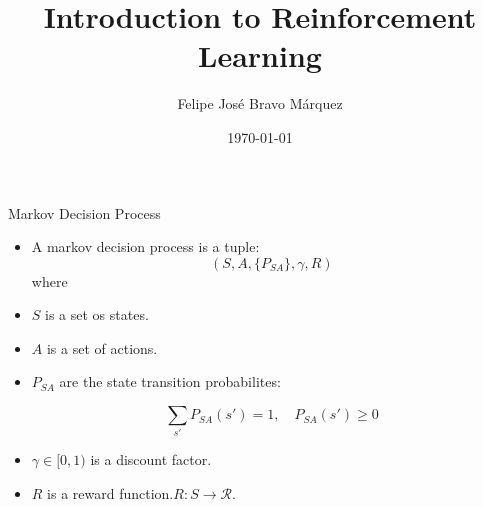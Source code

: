 \documentclass[handout]{beamer}
\title{Introduction to Reinforcement Learning}
\author[Felipe Bravo Márquez]{\footnotesize
 \textcolor[rgb]{0.00,0.00,1.00}{Felipe José Bravo Márquez}}
\date{ \today }
\begin{document}
\begin{frame}
\titlepage


\end{frame}




\begin{frame}{Markov Decision Process}
\scriptsize{
\begin{itemize}
\item A markov decision process is a tuple: 
\begin{displaymath}
 (S,A,\{P_{SA}\},\gamma,R)
\end{displaymath}
where
\item $S$ is a set os states.
\item $A$ is a set of actions.
\item $P_{SA}$ are the state transition probabilites:

\begin{displaymath}
 \sum_{s'}P_{SA}(s')=1, \quad P_{SA}(s')\geq 0
\end{displaymath}

\item $\gamma \in [0,1)$ is a discount factor.

\item $R$ is a reward function.$R: S \rightarrow \mathcal{R}$.

\end{itemize}


} 

\end{frame}
\end{document}
